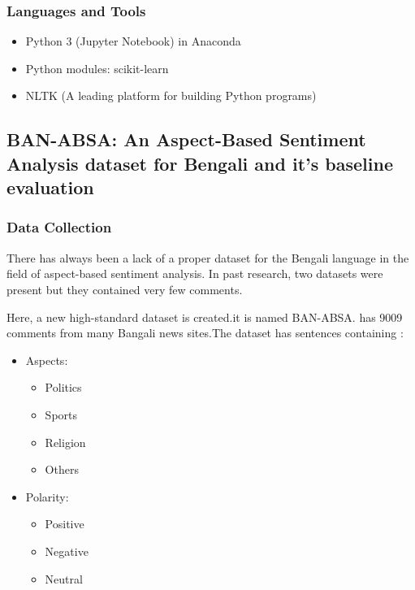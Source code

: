 \documentclass[a4paper,12pt]{article}
\begin{document}
\subsubsection{Languages and Tools}
\begin{itemize}
    \item Python 3 (Jupyter Notebook) in Anaconda
    \item Python modules: scikit-learn\cite{pedregosa2011scikit}
    \item NLTK (A leading platform for building Python programs)\cite{nltk}
\end{itemize}
\subsection{BAN-ABSA: An Aspect-Based Sentiment Analysis dataset for Bengali and it’s baseline evaluation}
\subsubsection{Data Collection}
There has always been a lack of a proper dataset for the Bengali language in the field of aspect-based sentiment analysis. In past research, two datasets were present but they contained very few comments.

\vspace{0.5cm}

Here, a new high-standard dataset is created.it is named BAN-ABSA. has 9009 comments from many Bangali news sites.The dataset has sentences containing :
    \begin{itemize}
    \item Aspects:
    \begin{itemize}
        \item Politics
        \item Sports
        \item Religion
        \item Others
    \end{itemize}
    \item Polarity:
    \begin{itemize}
        \item Positive 
        \item Negative
        \item Neutral
    \end{itemize}
\end{itemize}

\vspace{0.5cm}
\end{document}
